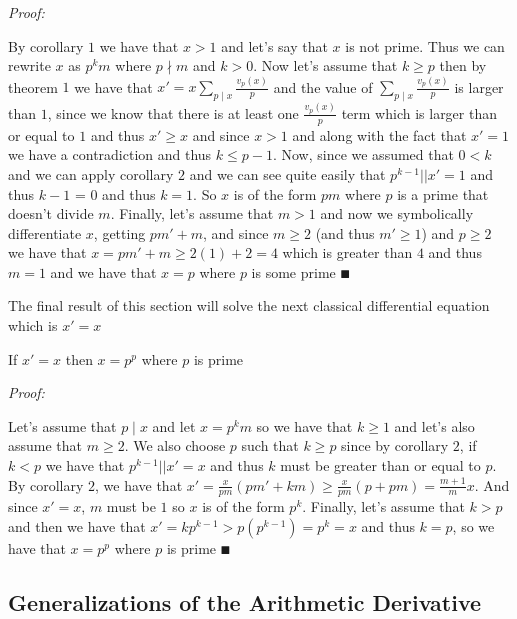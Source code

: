 \documentclass[paper=a4,fontsize=paper,12.5pt]{book}
\newcommand{\3}{\vspace*{3mm}}
\newcommand{\Proof}{\textit{Proof:}}
\newcommand{\D}{\vert \vert}
\newcommand{\Der}[1]{#1\sum_{p \mid #1} \frac{v_p(#1)}{p}}
\newcommand{\Id}[1]{\sum_{p \mid #1} \frac{v_p(#1)}{p}}
\newcommand{\Par}[2]{\frac{v_#2(#1)}{#2}}
\begin{document}
\Proof
 
By corollary $1$ we have that $x>1$ and let's say that $x$ is not prime. Thus we can rewrite $x$ as $p^k m$ where $p \nmid m$ and $k>0$. Now let's assume that $k\geq p$ then by theorem $1$ we have that $x' = \Der{x}$ and the value of $\Id{x}$ is larger than $1$, since we know that there is at least one $\Par{x}{p}$ term which is larger than or equal to $1$ and thus $x' \geq x$ and since $x>1$ and along with the fact that $x' =1$ we have a contradiction and thus $k \leq p-1$. Now, since we assumed that $0<k$ and we can apply corollary $2$ and we can see quite easily that $p^{k-1} \D x' = 1$ and thus $k-1$ = 0 and thus $k=1$. So $x$ is of the form $pm$ where $p$ is a prime that doesn't divide $m$. Finally, let's assume that $m>1$ and now we symbolically differentiate $x$, getting $pm' + m$, and since $m\geq 2$ \vspace*{.05mm} (and thus $m' \geq1$) and $p \geq2$ we have that $x =  pm' + m \geq 2(1) + 2 = 4 $ which is greater than $4$ and thus $m =1$ and we have that $x =p$ where $p$ is some prime $\QED$
 

\3

The final result of this section will solve the next classical differential equation which is $x' = x$

\begin{theorem}

If $x' =x $ then $x = p^p$ where $p$ is prime 


\end{theorem}

\Proof

Let's assume that $p \mid x$ and let $x = p^km$ so we have that $k\geq 1$ and let's also assume that $m\geq 2$. We also choose $p$ such that $k \geq p$ since by corollary $2$,  if $k <p $ we have that $p^{k-1} \D x' = x$ and thus $k$ must be greater than or equal to $p$. By corollary $2$, we have that $x' = \frac{x}{pm}(pm' + km) \geq \frac{x}{pm}(p + pm) = \frac{m+1}{m}x$. And since $x' = x$, $m$ must be $1$ so $x$ is of the form $p^k$. Finally, let's assume that $k>p$ and then we have that $x' = kp^{k-1} >  p(p^{k-1}) = p^{k} = x$ and thus $k = p$, so we have that $x = p^p$ where $p$ is prime $\QED$


\subsection*{Generalizations of the Arithmetic Derivative} 
\end{document}
